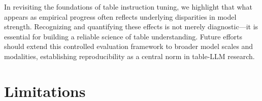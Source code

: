\documentclass[11pt]{article}
\begin{document}


In revisiting the foundations of table instruction tuning, we highlight that what appears as empirical progress often reflects underlying disparities in model strength.
Recognizing and quantifying these effects is not merely diagnostic—it is essential for building a reliable science of table understanding. 
Future efforts should extend this controlled evaluation framework to broader model scales and modalities, establishing reproducibility as a central norm in table-LLM research.



\section*{Limitations}
\end{document}
